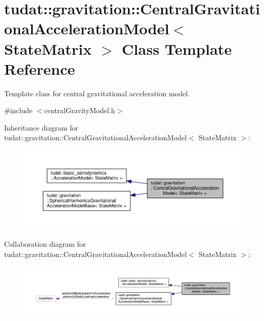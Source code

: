 \hypertarget{classtudat_1_1gravitation_1_1CentralGravitationalAccelerationModel}{}\section{tudat\+:\+:gravitation\+:\+:Central\+Gravitational\+Acceleration\+Model$<$ State\+Matrix $>$ Class Template Reference}
\label{classtudat_1_1gravitation_1_1CentralGravitationalAccelerationModel}


Template class for central gravitational acceleration model.  




{\ttfamily \#include $<$central\+Gravity\+Model.\+h$>$}



Inheritance diagram for tudat\+:\+:gravitation\+:\+:Central\+Gravitational\+Acceleration\+Model$<$ State\+Matrix $>$\+:
\nopagebreak
\begin{figure}[H]
\begin{center}
\leavevmode
\includegraphics[width=350pt]{classtudat_1_1gravitation_1_1CentralGravitationalAccelerationModel__inherit__graph}
\end{center}
\end{figure}


Collaboration diagram for tudat\+:\+:gravitation\+:\+:Central\+Gravitational\+Acceleration\+Model$<$ State\+Matrix $>$\+:
\nopagebreak
\begin{figure}[H]
\begin{center}
\leavevmode
\includegraphics[width=350pt]{classtudat_1_1gravitation_1_1CentralGravitationalAccelerationModel__coll__graph}
\end{center}
\end{figure}
